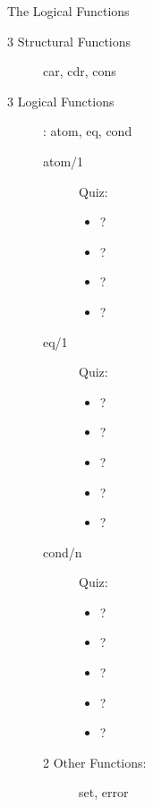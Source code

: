 \documentclass[fleqn]{beamer}
\begin{document}
\begin{frame}{The Logical Functions}
\begin{description}
  \item[3 Structural Functions] car, cdr, cons
  \item[3 Logical Functions]: atom, eq, cond
    \begin{description}
      \item[atom/1] Quiz:
        \begin{itemize}
          \item {}?
          \item {}?
          \item {}?
          \item {}?
        \end{itemize}
      \item[eq/1] Quiz:
        \begin{itemize}
          \item {}?
          \item {}?
          \item {}?
          \item {}?
          \item {}?
        \end{itemize}
      \item[cond/n] Quiz:
        \begin{itemize}
          \item {}?
          \item {}?
          \item {}?
          \item {}?
          \item {}?
        \end{itemize}
      \item[2 Other Functions:] set, error
    \end{description}
\end{description}
\end{frame}
\end{document}
